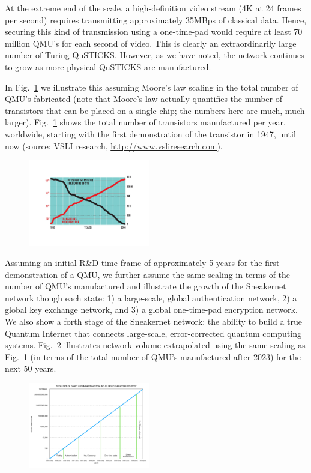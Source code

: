 \documentclass[twocolumn, aps, rmp, amsmath, amssymb, nofootinbib, superscriptaddress, longbibliography, floatfix, table-of-contents, eqsecnum]{revtex4-2}
\begin{document}
At the extreme end of the scale, a high-definition video stream (4K at 24 frames per second) requires transmitting approximately 35MBps of classical data. Hence, securing this kind of transmission using a one-time-pad would require at least 70 million QMU's for each second of video. This is clearly an extraordinarily large number of Turing QuSTICKS. However, as we have noted, the network continues to grow as more physical QuSTICKS are manufactured. 

In Fig.~\ref{fig:transistor} we illustrate this assuming Moore's law scaling in the total number of QMU's fabricated (note that Moore's law actually quantifies the number of transistors that can be placed on a single chip; the numbers here are much, much larger). Fig.~\ref{fig:transistor} shows the total number of transistors manufactured per year, worldwide, starting with the first demonstration of the transistor in 1947, until now (source: VSLI research, \href{http://www.vsliresearch.com}{http://www.vsliresearch.com}). 

\begin{figure}[htbp!]
	\includegraphics[clip=true, width=0.475\textwidth]{transistor}
	\caption{} \label{fig:transistor}
\end{figure}

Assuming an initial R\&D time frame of approximately 5 years for the first demonstration of a QMU, we further assume the same scaling in terms of the number of QMU's manufactured and illustrate the growth of the Sneakernet network though each state: 1) a large-scale, global authentication network, 2) a global key exchange network, and 3) a global one-time-pad encryption network. We also show a forth stage of the Sneakernet network: the ability to build a true Quantum Internet that connects large-scale, error-corrected quantum computing systems. Fig.~\ref{fig:QMU} illustrates network volume extrapolated using the same scaling as Fig.~\ref{fig:transistor} (in terms of the total number of QMU's manufactured after 2023) for the next 50 years. 

\begin{figure}[htbp!]
	\includegraphics[clip=true, width=0.475\textwidth]{QMU}
	\caption{} \label{fig:QMU}
\end{figure}
\end{document}
